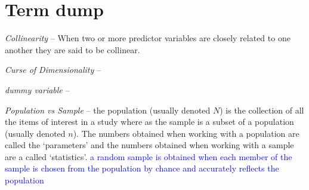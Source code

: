 \chapter{Term dump}

\emph{Collinearity} -- When two or more predictor variables are closely related to one another they are said to be collinear.

\emph{Curse of Dimensionality} --

\emph{dummy variable} --


\emph{Population vs Sample} -- the population (usually denoted $N$) is the collection of all the items of interest in a study where as the sample is a subset of a population (usually denoted $n$). The numbers obtained when working with a population are called the `parameters' and the numbers obtained when working with a sample are a called `statistics'. \textcolor{blue}{a random sample is obtained when each member of the sample is chosen from the population by chance and accurately reflects the population}